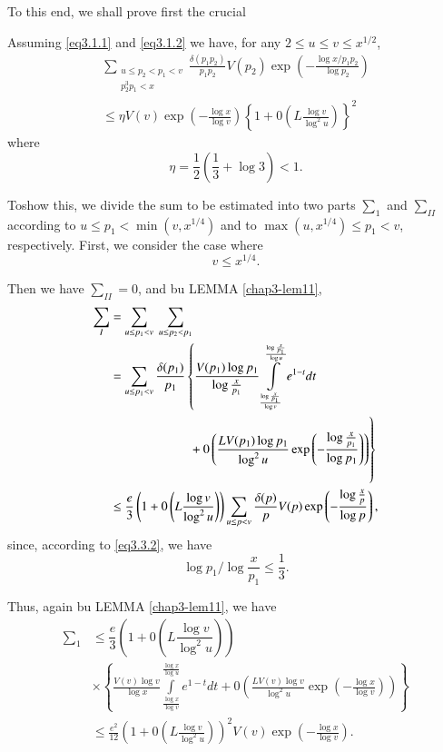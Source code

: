 To this end, we shall prove first the crucial

\begin{Lemma}\label{chap3-lem14}%
Assuming \eqref{eq3.1.1} and \eqref{eq3.1.2} we have, for any $2 \le u
\le v \le x^{1/2}$, 
\begin{multline*}
   \sum_{\substack{u \le p_2 < p_1 < v \\ {p^3_2 p_1 < x}}}
   \frac{\delta(p_1 p_2)}{p_1 p_2} V(p_2) \exp\left(-\frac{\log x/p_1
     p_2}{\log p_2}\right)\\ 
   \le \eta V(v) \exp \left(-\frac{\log x}{\log v}\right) \left\{1+0
   \left(L \frac{\log v}{\log^2 u}\right)\right\}^2 
\end{multline*}
where
$$
\eta= \frac{1}{2}\left(\frac{1}{3}+ \log 3\right) < 1.
$$
\end{Lemma}

To\pageoriginale show this, we divide the sum to be estimated into two parts
$\sum_1$ and $\sum_{II}$ according to $u \le p_1 < \min(v,x^{1/4})$
and to $\max (u,x^{1/4})\le p_1 < v$, respectively. First, we consider
the case where 
\begin{equation*}
  v \le x^{1/4}.\tag{3.3.2}\label{eq3.3.2}
\end{equation*}

Then we have $\sum_{II}=0$, and bu LEMMA \ref{chap3-lem11},
\begin{align*}
  \sum_I  &= \sum_{u \le p_1 < v} ~\sum_{u \le p_2 < p_1}\\ 
   & =\sum_{u \le p_1 < v} \frac{\delta(p_1)}{p_1}
  \left\{ \frac{V(p_1)\log p_1}{\log \frac{x}{p_1}} \int \limits^{\frac{\log
      \frac{x}{p_1}}{\log u}}_{\frac{\log \frac{x}{p_1}}{\log v}}
  e^{1-t}dt\right.\\
  &\qquad \qquad \qquad \left. \vphantom{\int \limits^{\frac{\log
      \frac{x}{p_1}}{\log u}}_{\frac{\log \frac{x}{p_1}}{\log v}}} 
   + 0 \left( \frac{LV(p_1)\log p_1}{\log^2 u}  
   \exp \left(-\frac{\log \frac{x}{p_1}}{\log p_1}\right)\right)\right\}\\
   &\le \frac{e}{3}\left(1+ 0\left(L \frac{\log v}{\log^2
    u}\right)\right) \sum_{u \le p < 
    v} \frac{\delta(p)}{p}V(p) \exp \left(-\frac{\log \frac{x}{p}}{\log
    p}\right), 
\end{align*}
since, according to \eqref{eq3.3.2}, we have
$$
\log p_1/\log \frac{x}{p_1} \le \frac{1}{3}.
$$

Thus, again bu LEMMA \ref{chap3-lem11}, we have
 \begin{align*}
   \sum_1 & \le \dfrac{e}{3}\left(1+ 0\left(L \dfrac{\log v}{\log^2
     u}\right)\right)\\ 
   & \times \left\{ \frac{V(v)\log v}{\log x} \int \limits^{\frac{\log
       x}{\log u}}_{\frac{\log x}{\log v}} e^{1-t} dt+0\left(\frac
       {LV(v)\log v}{\log^2 u} \exp\left(- \frac{\log x}{\log
         v}\right)\right)\right\}\\  
       & \le \frac{e^2}{12}\left(1+0\left(L\frac{\log v}{\log^2
         u}\right)\right)^2 V(v)\exp\left(-\frac{\log x}{\log v}\right). 
\end{align*}

